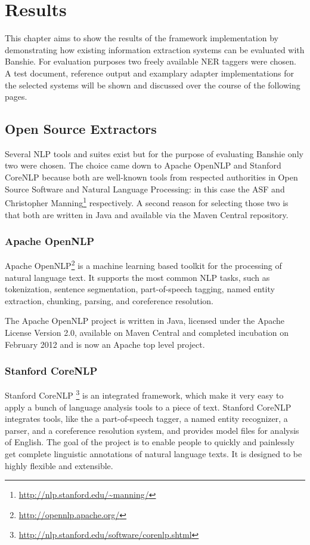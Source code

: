 \section{Results}
\label{sec:results}
This chapter aims to show the results of the framework implementation by demonstrating how existing information extraction systems can be evaluated with Banshie. For evaluation purposes two freely available \gls{NER} taggers were chosen. A test document, reference output and examplary adapter implementations for the selected systems will be shown and discussed over the course of the following pages.

\subsection{Open Source Extractors}
Several \gls{NLP} tools and suites exist but for the purpose of evaluating Banshie only two were chosen. The choice came down to Apache OpenNLP and Stanford CoreNLP because both are well-known tools from respected authorities in Open Source Software and Natural Language Processing: in this case the \acs{ASF} and Christopher Manning\footnote{\url{http://nlp.stanford.edu/~manning/}} respectively. A second reason for selecting those two is that both are written in Java and available via the Maven Central repository.

\subsubsection{Apache OpenNLP}
Apache OpenNLP\footnote{\url{http://opennlp.apache.org/}} is a machine learning based toolkit for the processing of natural language text. It supports the most common NLP tasks, such as tokenization, sentence segmentation, part-of-speech tagging, named entity extraction, chunking, parsing, and coreference resolution. \cite{OpenNLP}

The Apache OpenNLP project is written in Java, licensed under the Apache License Version 2.0, available on Maven Central and completed incubation on February 2012 and is now an Apache top level project.

\subsubsection{Stanford CoreNLP}
Stanford CoreNLP
\footnote{\url{http://nlp.stanford.edu/software/corenlp.shtml}} is an integrated framework, which make it very easy to apply a bunch of language analysis tools to a piece of text. Stanford CoreNLP integrates tools, like the a part-of-speech tagger, a named entity recognizer, a parser, and a coreference resolution system, and provides model files for analysis of English. The goal of the project is to enable people to quickly and painlessly get complete linguistic annotations of natural language texts. It is designed to be highly flexible and extensible. \cite{CoreNLP}


